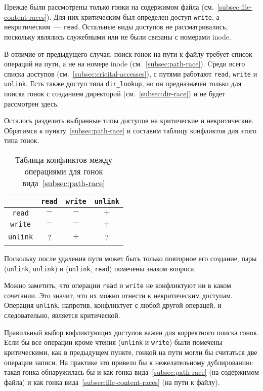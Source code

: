 Прежде были рассмотрены только гонки на содержимом файла (см.~\ref{subsec:file-content-races}). Для них критическим был определен доступ \texttt{write}, а некритическим~--- \texttt{read}. Остальные виды доступов не рассматривались, поскольку являлись служебными или не были связаны с номерами inode.

В отличие от предыдущего случая, поиск гонок на пути к файлу требует список операций на пути, а не на номере inode (см.~\ref{subsec:path-race}). Cреди всего списка доступов (см.~\ref{subsec:cricital-accesses}), с путями работают \texttt{read}, \texttt{write} и \texttt{unlink}. Есть также доступ типа \texttt{dir\_lookup}, но он предназначен только для поиска гонок с созданием директорий (см.~\ref{subsec:dir-race}) и не будет рассмотрен здесь.

Осталось разделить выбранные типы доступов на критические и некритические. Обратимся к пункту~\ref{subsec:path-race} и составим таблицу конфликтов для этого типа гонок.

\begin{table}[htbp]
    \centering
    \begin{tabular}{cccc}
        \toprule
        & \texttt{read} & \texttt{write} & \texttt{unlink} \\
        \midrule
        \texttt{read} & $-$ & $-$ & $+$\\
        \texttt{write} & $-$ & $-$ & $+$\\
        \texttt{unlink} & ? & $+$ & ?\\
        \bottomrule
    \end{tabular}
    \caption{Таблица конфликтов между операциями для гонок вида~\ref{subsec:path-race}}
    \label{fig:conflict-table-path-race}
\end{table}

Поскольку после удаления пути может быть только повторное его создание, пары (\texttt{unlink}, \texttt{unlink}) и (\texttt{unlink}, \texttt{read}) помечены знаком вопроса.

Можно заметить, что операции \texttt{read} и \texttt{write} не конфликтуют ни в каком сочетании. Это значит, что их можно отнести к некритическим доступам. Операция \texttt{unlink}, напротив, конфликтует с любой другой операцей, и следовательно, является критической.

Правильный выбор кофликтующих доступов важен для корректного поиска гонок. Если бы все операции кроме чтения (\texttt{unlink} и \texttt{write}) были помечены критическими, как в предыдущем пункте, гонкой на пути могли бы считаться две операции записи. На практике это привело бы к нежелательному дублированию: такая гонка обнаружилась бы и как гонка вида~\ref{subsec:path-race} (на содержимом файла) и как гонка вида~\ref{subsec:file-content-races} (на пути к файлу).

